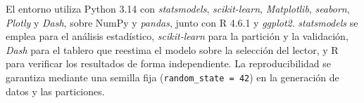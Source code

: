        El entorno utiliza Python 3.14 con \textit{statsmodels},
        \textit{scikit-learn}, \textit{Matplotlib}, \textit{seaborn},
        \textit{Plotly} y \textit{Dash}, sobre NumPy y \textit{pandas}, junto
        con R 4.6.1 y \textit{ggplot2}. \textit{statsmodels} se emplea para el
        análisis estadístico, \textit{scikit-learn} para la partición y la
        validación, \textit{Dash} para el tablero que reestima el modelo sobre
        la selección del lector, y R para verificar los resultados de forma
        independiente. La reproducibilidad se garantiza mediante una semilla
        fija (\texttt{random\_state = 42}) en la generación de datos y las
        particiones.